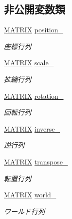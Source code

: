 \subsection*{非公開変数類}
\begin{DoxyCompactItemize}
\item 
\mbox{\hyperlink{_matrix_8h_a032295cd9fb1b711757c90667278e744}{M\+A\+T\+R\+IX}} \mbox{\hyperlink{class_matrix_group_a15328c5929f74d11755a9ac11f5cbfb2}{position\+\_\+}}
\begin{DoxyCompactList}\small\item\em 座標行列 \end{DoxyCompactList}\item 
\mbox{\hyperlink{_matrix_8h_a032295cd9fb1b711757c90667278e744}{M\+A\+T\+R\+IX}} \mbox{\hyperlink{class_matrix_group_a51698db9bd361a12b1450a9596bdcd97}{scale\+\_\+}}
\begin{DoxyCompactList}\small\item\em 拡縮行列 \end{DoxyCompactList}\item 
\mbox{\hyperlink{_matrix_8h_a032295cd9fb1b711757c90667278e744}{M\+A\+T\+R\+IX}} \mbox{\hyperlink{class_matrix_group_a614eb91623028b6c29bd8890f6f1c6d1}{rotation\+\_\+}}
\begin{DoxyCompactList}\small\item\em 回転行列 \end{DoxyCompactList}\item 
\mbox{\hyperlink{_matrix_8h_a032295cd9fb1b711757c90667278e744}{M\+A\+T\+R\+IX}} \mbox{\hyperlink{class_matrix_group_aafc3e507a37830899c7a0775b6a30d15}{inverse\+\_\+}}
\begin{DoxyCompactList}\small\item\em 逆行列 \end{DoxyCompactList}\item 
\mbox{\hyperlink{_matrix_8h_a032295cd9fb1b711757c90667278e744}{M\+A\+T\+R\+IX}} \mbox{\hyperlink{class_matrix_group_a1e5305fc950112de091922f97dc2872d}{transpose\+\_\+}}
\begin{DoxyCompactList}\small\item\em 転置行列 \end{DoxyCompactList}\item 
\mbox{\hyperlink{_matrix_8h_a032295cd9fb1b711757c90667278e744}{M\+A\+T\+R\+IX}} \mbox{\hyperlink{class_matrix_group_a098fd7ddc68b1d9191ded4bb7bc0d187}{world\+\_\+}}
\begin{DoxyCompactList}\small\item\em ワールド行列 \end{DoxyCompactList}\end{DoxyCompactItemize}


